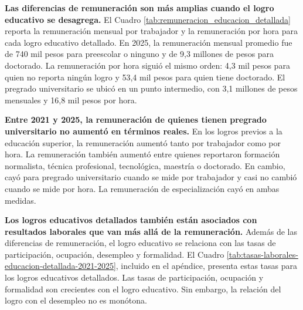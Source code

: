 




\textbf{Las diferencias de remuneración son más amplias cuando el logro educativo se desagrega.} El Cuadro \ref{tab:remuneracion_educacion_detallada} reporta la remuneración mensual por trabajador y la remuneración por hora para cada logro educativo detallado. En 2025, la remuneración mensual promedio fue de 740 mil pesos para preescolar o ninguno y de 9,3 millones de pesos para doctorado. La remuneración por hora siguió el mismo orden: 4,3 mil pesos para quien no reporta ningún logro y 53,4 mil pesos para quien tiene doctorado. El pregrado universitario se ubicó en un punto intermedio, con 3,1 millones de pesos mensuales y 16,8 mil pesos por hora. %

\textbf{Entre 2021 y 2025, la remuneración de quienes tienen pregrado universitario no aumentó en términos reales.} En los logros previos a la educación superior, la remuneración aumentó tanto por trabajador como por hora. La remuneración también aumentó entre quienes reportaron formación normalista, técnica profesional, tecnológica, maestría o doctorado. En cambio, cayó para pregrado universitario cuando se mide por trabajador y casi no cambió cuando se mide por hora. La remuneración de especialización cayó en ambas medidas. %

\textbf{Los logros educativos detallados también están asociados con resultados laborales que van más allá de la remuneración.} Además de las diferencias de remuneración, el logro educativo se relaciona con las tasas de participación, ocupación, desempleo y formalidad. El Cuadro \ref{tab:tasas-laborales-educacion-detallada-2021-2025}, incluido en el apéndice, presenta estas tasas para los logros educativos detallados. Las tasas de participación, ocupación y formalidad son crecientes con el logro educativo. Sin embargo, la relación del logro con el desempleo no es monótona.

